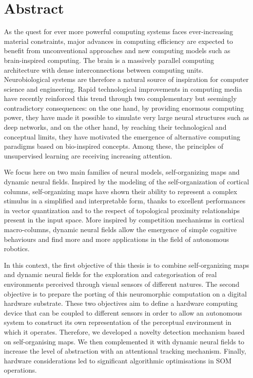 \chapter*{Abstract}
\markboth{}{}

As the quest for ever more powerful computing systems faces ever-increasing material constraints, major advances in computing efficiency are expected to benefit from unconventional approaches and new computing models such as brain-inspired computing. The brain is a massively parallel computing architecture with dense interconnections between computing units. Neurobiological systems are therefore a natural source of inspiration for computer science and engineering. Rapid technological improvements in computing media have recently reinforced this trend through two complementary but seemingly contradictory consequences: on the one hand, by providing enormous computing power, they have made it possible to simulate very large neural structures such as deep networks, and on the other hand, by reaching their technological and conceptual limits, they have motivated the emergence of alternative computing paradigms based on bio-inspired concepts. Among these, the principles of unsupervised learning are receiving increasing attention.

We focus here on two main families of neural models, self-organizing maps and dynamic neural fields. Inspired by the modeling of the self-organization of cortical columns, self-organizing maps have shown their ability to represent a complex stimulus in a simplified and interpretable form, thanks to excellent performances in vector quantization and to the respect of topological proximity relationships present in the input space. More inspired by competition mechanisms in cortical macro-columns, dynamic neural fields allow the emergence of simple cognitive behaviours and find more and more applications in the field of autonomous robotics.

In this context, the first objective of this thesis is to combine self-organizing maps and dynamic neural fields for the exploration and categorisation of real environments perceived through visual sensors of different natures. The second objective is to prepare the porting of this neuromorphic computation on a digital hardware substrate. These two objectives aim to define a hardware computing device that can be coupled to different sensors in order to allow an autonomous system to construct its own representation of the perceptual environment in which it operates. Therefore, we developed a novelty detection mechanism based on self-organising maps. We then complemented it with dynamic neural fields to increase the level of abstraction with an attentional tracking mechanism. Finally, hardware considerations led to significant algorithmic optimisations in SOM operations.